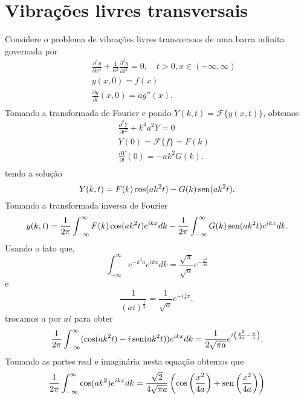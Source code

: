 \section{Vibrações livres transversais} 
Considere o problema de vibrações livres transversais de uma barra infinita governada por
\begin{eqnarray*}
&&\frac{\partial^4 y}{\partial x^4}+\frac{1}{a^2}\frac{\partial^2
y}{\partial t^2}=0,\quad t>0, x\in (-\infty,\infty)\\
&&y(x,0)=f(x)\\
&&\frac{\partial y}{\partial t}(x,0)=ag''(x).\\
\end{eqnarray*}
Tomando a transformada de Fourier e pondo $Y(k,t)=\mathcal{F}\{y(x,t)\}$,
obtemos
\begin{eqnarray*}
&&\frac{\partial^2 Y}{\partial t^2}+k^4a^2Y=0\\
&&Y(0)=\mathcal{F}\{f\}=F(k)\\
&&\frac{\partial Y}{\partial t}(0)=-ak^2G(k).\\
\end{eqnarray*}
tendo a solução
\begin{equation*}
Y(k,t)=F(k)\cos (ak^2t)-G(k)\operatorname{sen} (ak^2t).
\end{equation*}
Tomando a transformada inversa de Fourier
\begin{equation*}
y(k,t)=\frac{1}{2\pi}\int_{-\infty}^\infty F(k)\cos
(ak^2 t)e^{ik
x}dk-\frac{1}{2\pi}\int_{-\infty}^\infty G(k)\operatorname{sen}
(ak^2 t)e^{ik x}dk.
\end{equation*}
Usando o fato que,
\begin{equation*}
\int_{-\infty}^\infty e^{-k^2 a}e^{ik
x}dk=\frac{\sqrt{\pi}}{\sqrt{a}}e^{-\frac{x^2}{4a}}
\end{equation*}
e
\begin{equation*}
\frac{1}{(a i)^{\frac{1}{2}}}=\frac{1}{\sqrt{a
}}e^{-i\frac{1}{4}\pi},
\end{equation*}
trocamos $a$ por $ai$ para obter
\begin{equation*}
\frac{1}{2\pi}\int_{-\infty}^\infty (\cos (ak^2 t)-i\operatorname{sen}
(ak^2 t))e^{ik
x}dk=\frac{1}{2\sqrt{\pi a}}e^{i\left(\frac{x^2}{4a}-\frac{\pi}{4}\right)}.
\end{equation*}
Tomando as partes real e imaginária nesta equação obtemos que
\begin{equation*}
\frac{1}{2\pi}\int_{-\infty}^\infty \cos (ak^2)e^{ik
x}dk=\frac{\sqrt{2}}{4\sqrt{\pi a}}\left(\cos \left(\frac{x^2}{4a}\right)+\operatorname{sen}\left(
\frac{x^2}{4a}\right)\right)
\end{equation*}
